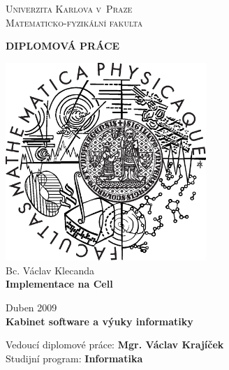 \begin{center}


\large
\textsc{
Univerzita Karlova v~Praze\\
Matematicko-fyzikální fakulta\\[1.2cm]
}


\Huge
\textbf{
DIPLOMOVÁ PRÁCE\\[1.5cm]
}


\includegraphics[height=7.5cm]{data/logo.eps}\\[2cm]


\Large
Bc. Václav Klecanda\\[1cm]

\LARGE
\textbf{
Implementace na Cell\\[1cm]
}

\normalsize
Duben 2009\\[1.5cm]

\large
\textbf{
Kabinet software a výuky informatiky\\
}

Vedoucí diplomové práce: \textbf{Mgr. Václav Krajíček}\\

Studijní program: \textbf{Informatika}

\end{center}

\pagebreak
 
